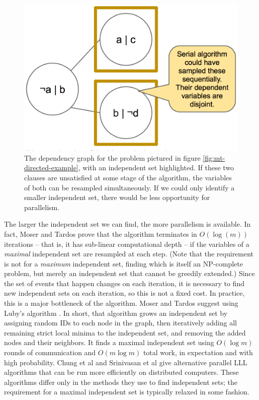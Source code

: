 \documentclass[twocolumn]{article}
\begin{document}
\begin{figure}[ht]
  \includegraphics[scale=0.4]{figures/mt-independence-example.png}
  \caption{The dependency graph for the problem pictured in figure \ref{fig:mt-directed-example}, with an independent set highlighted.  If these two clauses are unsatisfied at some stage of the algorithm, the variables of both can be resampled simultaneously.  If we could only identify a smaller independent set, there would be less opportunity for parallelism.}
  \label{fig:mt-independence-example}
\end{figure}

The larger the independent set we can find, the more parallelism is available.  In fact, Moser and Tardos prove that the algorithm terminates in $O(\log(m))$ iterations -- that is, it has sub-linear computational depth -- if the variables of a \emph{maximal} independent set are resampled at each step.  (Note that the requirement is not for a \emph{maximum} independent set, finding which is itself an NP-complete problem, but merely an independent set that cannot be greedily extended.)  Since the set of events that happen changes on each iteration, it is necessary to find new independent sets on each iteration, so this is not a fixed cost.  In practice, this is a major bottleneck of the algorithm.  Moser and Tardos suggest using Luby's algorithm \cite{luby1986simple}.  In short, that algorithm grows an independent set by assigning random IDs to each node in the graph, then iteratively adding all remaining strict local minima to the independent set, and removing the added nodes and their neighbors.  It finds a maximal independent set using $O(\log m)$ rounds of communication and $O(m \log m)$ total work, in expectation and with high probability.  Chung et al \cite{chung2014distributed} and Srinivasan et al \cite{haeupler2011new} give alternative parallel LLL algorithms that can be run more efficiently on distributed computers.  These algorithms differ only in the methods they use to find independent sets; the requirement for a maximal independent set is typically relaxed in some fashion.
\end{document}
